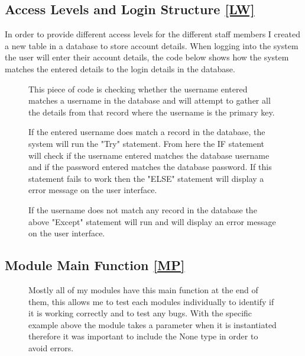 \subsection{Access Levels and Login Structure \ref{LW}}

In order to provide different access levels for the different staff members I created a new table in a database to store account details. When logging into the system the user will enter their account details, the code below shows how the system matches the entered details to the login details in the database.

 \begin{figure}[H]
    \caption{This piece of code is checking whether the username entered matches a username in the database and will attempt to gather all the details from that record where the username is the primary key.}\label{fig:Dialog Class}
\end{figure}

 \begin{figure}[H]
    \caption{If the entered username does match a record in the database, the system will run the "Try" statement. From here the IF statement will check if the username entered matches the database username and if the password entered matches the database password. If this statement fails to work then the "ELSE" statement will display a error message on the user interface.}\label{fig:Dialog Class}
\end{figure}

 \begin{figure}[H]
    \caption{If the username does not match any record in the database the above "Except" statement will run and will display an error message on the user interface. }\label{fig:Dialog Class}
\end{figure}

\subsection{Module Main Function \ref{MP}}
 
 \begin{figure}[H]
    \caption{Mostly all of my modules have this main function at the end of them, this allows me to test each modules individually to identify if it is working correctly and to test any bugs. With the specific example above the module takes a parameter when it is instantiated therefore it was important to include the None type in order to avoid errors.} \label{fig:Dialog Class}
\end{figure}

